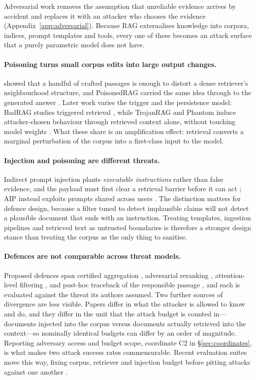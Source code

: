 Adversarial work removes the assumption that unreliable evidence arrives by accident and
replaces it with an attacker who chooses the evidence (Appendix~\ref{app:adversarial}).
Because RAG externalises knowledge into corpora, indices, prompt templates and tools, every
one of these becomes an attack surface that a purely parametric model does not have.

\paragraph{Poisoning turns small corpus edits into large output changes.}
\citet{poisoningRetrievalCorpora2023} showed that a handful of crafted passages is enough to
distort a dense retriever's neighbourhood structure, and PoisonedRAG carried the same idea
through to the generated answer \citep{poisonedRAG2024}. Later work varies the trigger and the
persistence model: BadRAG studies triggered retrieval \citep{badRAG2024}, while TrojanRAG and
Phantom induce attacker-chosen behaviour through retrieved context alone, without touching
model weights \citep{trojanRAG2024,phantom2024}. What these share is an amplification effect:
retrieval converts a marginal perturbation of the corpus into a first-class input to the model.

\paragraph{Injection and poisoning are different threats.}
Indirect prompt injection plants \emph{executable instructions} rather than false evidence, and
the payload must first clear a retrieval barrier before it can act \citep{rrag005}; AIP instead
exploits prompts shared across users \citep{aip2025}. The distinction matters for defence
design, because a filter tuned to detect implausible claims will not detect a plausible
document that ends with an instruction. Treating templates, ingestion pipelines and retrieved
text as untrusted boundaries is therefore a stronger design stance than treating the corpus as
the only thing to sanitise.

\paragraph{Defences are not comparable across threat models.}
Proposed defences span certified aggregation \citep{certifiedRAG2024}, adversarial reranking
\citep{rrag004}, attention-level filtering \citep{rrag015}, and post-hoc traceback of the
responsible passage \citep{rrag128}, and each is evaluated against the threat its authors
assumed. Two further sources of divergence are less visible. Papers differ in what the
attacker is allowed to know and do, and they differ in the unit that the attack budget is
counted in---documents injected into the corpus versus documents actually retrieved into the
context---so nominally identical budgets can differ by an order of magnitude. Reporting
adversary access and budget scope, coordinate C2 in \S\ref{sec:coordinates}, is what makes two
attack success rates commensurable. Recent evaluation suites move this way, fixing
corpus, retriever and injection budget before pitting attacks against one another
\citep{rrag019,rrag023,rrag033}.
